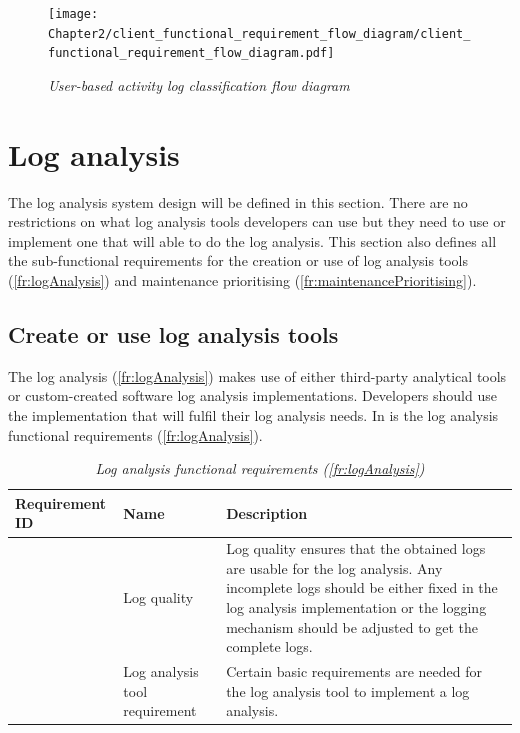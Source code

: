 \begin{figure}[!htb] %
	\centering %
	\texttt{[image: Chapter2/client\_functional\_requirement\_flow\_diagram/client\_functional\_requirement\_flow\_diagram.pdf]}
	\caption[User-based activity log classification flow diagram]
	{\textit{User-based activity log classification flow diagram}}\label{fig:ch2_user_based_actvity_classification}
\end{figure}

\clearpage

\section{Log analysis}\label{ch2:sec_system_utilisation_analysis}
The log analysis system design will be defined in this section. There are no restrictions on what log analysis tools developers can use but they need to use or implement one that will able to do the log analysis. This section also defines all the sub-functional requirements for the creation or use of log analysis tools (\ref{fr:logAnalysis}) and maintenance prioritising (\ref{fr:maintenancePrioritising}).

\subsection{Create or use log analysis tools}\label{sec:ch2_logAnalysisTools}
The log analysis (\ref{fr:logAnalysis}) makes use of either third-party analytical tools or custom-created software log analysis implementations. Developers should use the implementation that will fulfil their log analysis needs. In  is the log analysis functional requirements (\ref{fr:logAnalysis}).

\setcounter{phase}{3}
\setcounter{subphase}{0}
\begin{table}[!htb]
	\centering
	\caption[Log analysis functional requirements (\ref{fr:logAnalysis})]
	{\textit{Log analysis functional requirements (\ref{fr:logAnalysis})}}
	\label{tbl:ch2_logAnalysis}
	\begin{tabularx}{\textwidth}{|l|l|X|}
		\hline \textbf{Requirement ID} & \textbf{Name} & \textbf{Description} \\
		\hline \subphase{fr:logQuality} & Log quality & \RaggedRight Log quality ensures that the obtained logs are usable for the log analysis. Any incomplete logs should be either fixed in the log analysis implementation or the logging mechanism should be adjusted to get the complete logs. \\
		\hline \subphase{fr:logAnalysisTool} & Log analysis tool requirement & \RaggedRight Certain basic requirements are needed for the log analysis tool to implement a log analysis. \\
		\hline
	\end{tabularx}
\end{table}

